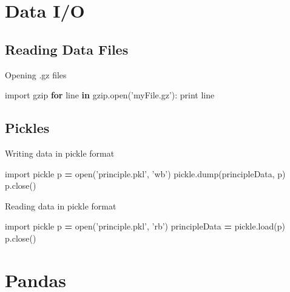 \documentclass[]{book}
\newenvironment{Shaded}{\begin{snugshade}}{\end{snugshade}}
\newcommand{\BuiltInTok}[1]{#1}
\newcommand{\ControlFlowTok}[1]{\textcolor[rgb]{0.13,0.29,0.53}{\textbf{#1}}}
\newcommand{\ImportTok}[1]{#1}
\newcommand{\KeywordTok}[1]{\textcolor[rgb]{0.13,0.29,0.53}{\textbf{#1}}}
\newcommand{\NormalTok}[1]{#1}
\newcommand{\OperatorTok}[1]{\textcolor[rgb]{0.81,0.36,0.00}{\textbf{#1}}}
\newcommand{\StringTok}[1]{\textcolor[rgb]{0.31,0.60,0.02}{#1}}
\begin{document}
\hypertarget{io}{%
\chapter{Data I/O}\label{io}}

\hypertarget{reading-data-files}{%
\section{Reading Data Files}\label{reading-data-files}}

Opening .gz files

\begin{Shaded}
\begin{Highlighting}[]
\ImportTok{import}\NormalTok{ gzip}
\ControlFlowTok{for}\NormalTok{ line }\KeywordTok{in}\NormalTok{ gzip.}\BuiltInTok{open}\NormalTok{(}\StringTok{'myFile.gz'}\NormalTok{):}
    \BuiltInTok{print}\NormalTok{ line}
\end{Highlighting}
\end{Shaded}

\hypertarget{pickles}{%
\section{Pickles}\label{pickles}}

Writing data in pickle format

\begin{Shaded}
\begin{Highlighting}[]
\ImportTok{import}\NormalTok{ pickle}
\NormalTok{p }\OperatorTok{=} \BuiltInTok{open}\NormalTok{(}\StringTok{'principle.pkl'}\NormalTok{, }\StringTok{'wb'}\NormalTok{)}
\NormalTok{pickle.dump(principleData, p)}
\NormalTok{p.close()}
\end{Highlighting}
\end{Shaded}

Reading data in pickle format

\begin{Shaded}
\begin{Highlighting}[]
\ImportTok{import}\NormalTok{ pickle}
\NormalTok{p }\OperatorTok{=} \BuiltInTok{open}\NormalTok{(}\StringTok{'principle.pkl'}\NormalTok{, }\StringTok{'rb'}\NormalTok{)}
\NormalTok{principleData }\OperatorTok{=}\NormalTok{ pickle.load(p)}
\NormalTok{p.close()}
\end{Highlighting}
\end{Shaded}

\hypertarget{pandas}{%
\chapter{Pandas}\label{pandas}}
\end{document}
